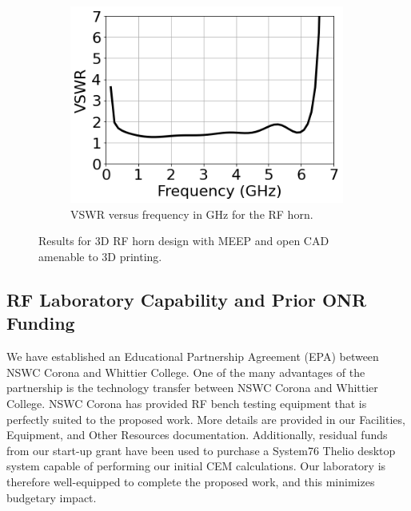 \documentclass[../../main.tex]{subfiles}
\begin{document}
\begin{figure}[ht]
\begin{subfigure}{0.65\textwidth}
\end{subfigure}
\hfill
\begin{subfigure}{0.3\textwidth}
    \includegraphics[width=0.99\textwidth]{figures/vswr.png}
	\caption{VSWR versus frequency in GHz for the RF horn.}
\end{subfigure}
\caption{Results for 3D RF horn design with MEEP and open CAD amenable to 3D printing.}
\label{fig:3d_cad}
\end{figure}

\subsection{RF Laboratory Capability and Prior ONR Funding}

We have established an Educational Partnership Agreement (EPA) between NSWC Corona and Whittier College.  One of the many advantages of the partnership is the technology transfer between NSWC Corona and Whittier College.  NSWC Corona has provided RF bench testing equipment that is perfectly suited to the proposed work.  More details are provided in our Facilities, Equipment, and Other Resources documentation.  Additionally, residual funds from our start-up grant have been used to purchase a System76 Thelio desktop system capable of performing our initial CEM calculations.  Our laboratory is therefore well-equipped to complete the proposed work, and this minimizes budgetary impact.  \\ \vspace{2.5mm}
\end{document}
